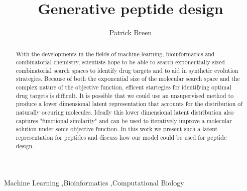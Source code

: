 \documentclass[preprint,12pt]{elsarticle}
\begin{document}
\begin{frontmatter}


\title{Generative peptide design}




\author{Patrick Breen}

\address{Athens Georgia, United States}

\begin{abstract}
With the developments in the fields of machine learning, bioinformatics and combinatorial chemistry, scientists hope to be able to search exponentially sized combinatorial search spaces to identify drug targets and to aid in synthetic evolution strategies. Because of both the exponential size of the molecular search space and the complex nature of the objective function, efficent startegies for identifying optimal drug targets is difficult. It is possible that we could use an unsupervised method to produce a lower dimensional latent representation that accounts for the distribution of naturally occuring molecules. Ideally this lower dimensional latent distribution also captures "functional similarity" and can be used to iteratively improve a molecular solution under some objective function. In this work we present such a latent representation for peptides and discuss how our model could be used for peptide design.
\end{abstract}

\begin{keyword}
Machine Learning \sep Bioinformatics \sep Computational Biology


\end{keyword}

\end{frontmatter}
\end{document}
